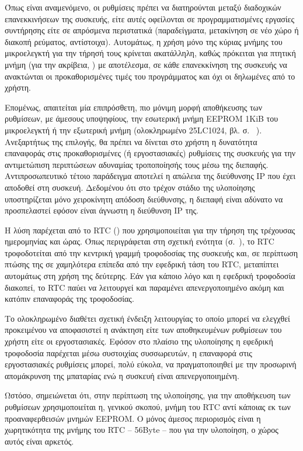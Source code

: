 Όπως είναι αναμενόμενο, οι ρυθμίσεις πρέπει να διατηρούνται μεταξύ διαδοχικών
επανεκκινήσεων της συσκευής, είτε αυτές οφείλονται σε προγραμματισμένες
εργασίες συντήρησης είτε σε απρόσμενα περιστατικά (παραδείγματα, μετακίνηση σε
νέο χώρο ή διακοπή ρεύματος, αντίστοιχα). Αυτομάτως, η χρήση μόνο της κύριας
μνήμης του μικροελεγκτή για την τήρησή τους κρίνεται ακατάλληλη, καθώς πρόκειται
για πτητική μνήμη (για την ακρίβεια, ) με αποτέλεσμα, σε κάθε
επανεκκίνηση της συσκευής να ανακτώνται οι προκαθορισμένες τιμές του
προγράμματος και όχι οι δηλωμένες από το χρήστη.

Επομένως, απαιτείται μία επιπρόσθετη, πιο μόνιμη μορφή αποθήκευσης των
ρυθμίσεων, με άμεσους υποψηφίους, την εσωτερική μνήμη EEPROM 1KiB του
μικροελεγκτή ή την εξωτερική μνήμη  (ολοκληρωμένο 25LC1024, βλ. σ.~%
\pageref{subsec:external-memory}). Ανεξαρτήτως της επιλογής, θα πρέπει να
δίνεται στο χρήστη η δυνατότητα επαναφοράς στις προκαθορισμένες (ή
εργοστασιακές) ρυθμίσεις της συσκευής για την αντιμετώπιση περιπτώσεων αδυναμίας
τροποποίησής τους μέσω της διεπαφής. Αντιπροσωπευτικό τέτοιο παράδειγμα αποτελεί
η απώλεια της διεύθυνσης IP που έχει αποδοθεί στη συσκευή. Δεδομένου ότι στο
τρέχον στάδιο της υλοποίησης υποστηρίζεται μόνο χειροκίνητη απόδοση διεύθυνσης,
η διεπαφή είναι αδύνατο να προσπελαστεί εφόσον είναι άγνωστη η διεύθυνση IP της.

Η λύση παρέχεται από το RTC () που χρησιμοποιείται για την
τήρηση της τρέχουσας ημερομηνίας και ώρας. Όπως περιγράφεται στη σχετική ενότητα
 (σ.~\pageref{sec:rtc}), το RTC τροφοδοτείται από την κεντρική
γραμμή τροφοδοσίας της συσκευής και, σε περίπτωση πτώσης της σε χαμηλότερα
επίπεδα από την εφεδρική τάση του RTC, μεταπίπτει αυτομάτως στη χρήση της
δεύτερης. Εάν για κάποιο λόγο και η εφεδρική τροφοδοσία διακοπεί, το RTC παύει
να λειτουργεί και παραμένει απενεργοποιημένο ακόμη και κατόπιν επαναφοράς της
τροφοδοσίας.

Το ολοκληρωμένο διαθέτει σχετική ένδειξη λειτουργίας το οποίο μπορεί να ελεγχθεί
προκειμένου να αποφασιστεί η ανάκτηση είτε των αποθηκευμένων ρυθμίσεων του
χρήστη είτε οι εργοστασιακές. Εφόσον στο πλαίσιο της υλοποίησης η εφεδρική
τροφοδοσία παρέχεται μέσω συστοιχίας συσσωρευτών, η επαναφορά στις εργοστασιακές
ρυθμίσεις
μπορεί, πολύ εύκολα, να πραγματοποιηθεί με την προσωρινή απομάκρυνση της
μπαταρίας ενώ η συσκευή είναι απενεργοποιημένη.

Ωστόσο, σημειώνεται ότι, στην περίπτωση της υλοποίησης, για την αποθήκευση των
ρυθμίσεων χρησιμοποιείται η, γενικού σκοπού, μνήμη του RTC αντί κάποιας εκ των
προαναφερθεισών μνημών EEPROM.
Ο μόνος άμεσος περιορισμός είναι η χωρητικότητα της μνήμης του RTC -- 56Byte --
που για την υλοποίηση, ο χώρος αυτός είναι αρκετός.

